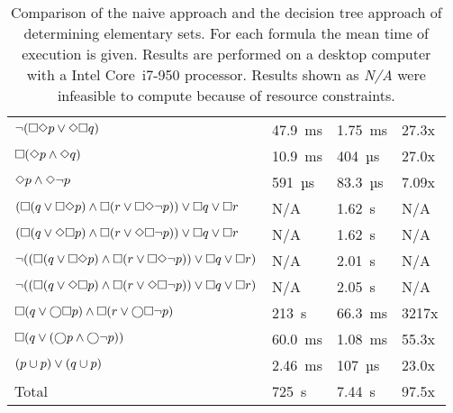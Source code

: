 \begin{table}[!ht]
\begin{tabular}{@{}llll@{}}
        $\lnot (\square \Diamond p \lor \Diamond \square q)$                                                              & 47.9~ms    & 1.75~ms    & 27.3x \\
        $\square  (\Diamond  p \land \Diamond  q)$                                                                   & 10.9~ms    & 404~µs     & 27.0x \\
        $\Diamond  p \land \Diamond  \lnot p$                                                                   & 591~µs     & 83.3~µs    & 7.09x \\
        \midrule
        $(\square  (q \lor \square \Diamond p) \land \square  (r \lor \square \Diamond  \lnot p)) \lor \square  q \lor \square  r$            & N/A        & 1.62~s     & N/A \\
        $(\square  (q \lor \Diamond \square p) \land \square  (r \lor \Diamond \square  \lnot p)) \lor \square  q \lor \square  r$            & N/A        & 1.62~s     & N/A \\
        $\lnot ((\square  (q \lor \square \Diamond p) \land \square  (r \lor \square \Diamond  \lnot p)) \lor \square  q \lor \square  r)$    & N/A        & 2.01~s     & N/A \\
        $\lnot ((\square  (q \lor \Diamond \square p) \land \square  (r \lor \Diamond \square  \lnot p)) \lor \square  q \lor \square  r)$    & N/A        & 2.05~s     & N/A \\
        $\square  (q \lor \bigcirc \square p) \land \square  (r \lor \bigcirc \square  \lnot p)$                                    & 213~s      & 66.3~ms    & 3217x \\
        \midrule
        $\square  (q \lor (\bigcirc p \land \bigcirc  \lnot p))$                                                     & 60.0~ms    & 1.08~ms    & 55.3x \\
        $(p \cup p) \lor (q \cup p)$                                                                    & 2.46~ms    & 107~µs     & 23.0x \\
        \bottomrule
        Total                                                                                       & 725~s      & 7.44~s     & 97.5x
 \\
        \bottomrule
    \end{tabular}
    \caption{Comparison of the naive approach and the decision tree approach of determining elementary sets. For each formula the mean time of execution is given. Results are performed on a desktop computer with a Intel\textsuperscript{\textregistered} Core\texttrademark~i7-950 processor. Results shown as \emph{N/A} were infeasible to compute because of resource constraints.}
    \label{tab:elem-test}
\end{table}